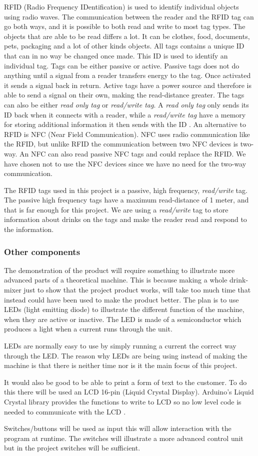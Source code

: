 RFID (Radio Frequency IDentification) is used to identify individual objects using radio waves.
The communication between the reader and the RFID tag can go both ways, and it is possible to both read and write to most tag types. 
The objects that are able to be read differs a lot. It can be clothes, food, documents, pets, packaging and a lot of other kinds objects. 
All tags contains a unique ID that can in no way be changed once made. This ID is used to identify an individual tag.
Tags can be either passive or active. Passive tags does not do anything until a signal from a reader transfers energy to the tag. Once activated it sends a signal back in return. Active tags have a power source and therefore is able to send a signal on their own, making the read-distance greater.
The tags can also be either \textit{read only tag} or \textit{read/write tag}. A \textit{read only tag} only sends its ID back when it connects with a reader, while a \textit{read/write tag} have a memory for storing additional information it then sends with the ID \citep{RFID}.
An alternative to RFID is NFC (Near Field Communication). NFC uses radio communication like the RFID, but unlike RFID the communication between two NFC devices is two-way. An NFC can also read passive NFC tags and could replace the RFID. We have chosen not to use the NFC devices since we have no need for the two-way communication.

The RFID tags used in this project is a passive, high frequency, \textit{read/write} tag. The passive high frequency tags have a maximum read-distance of 1 meter, and that is far enough for this project. We are using a \textit{read/write} tag to store information about drinks on the tags and make the reader read and respond to the information.
\subsubsection{Other components}
The demonstration of the product will require something to illustrate more advanced parts of a theoretical machine.
This is because making a whole drink-mixer just to show that the project product works, will take too much time that instead could have been used to make the product better. 
The plan is to use LEDs (light emitting diode) to illustrate the different function of the machine, when they are active or inactive. The LED is made of a semiconductor which produces a light when a current runs through the unit.

LEDs are normally easy to use by simply running a current the correct way through the LED.
The reason why LEDs are being using instead of making the machine is that there is neither time nor is it the main focus of this project.

It would also be good to be able to print a form of text to the customer. To do this there will be used an LCD 16-pin (Liquid Crystal Display). Arduino's Liquid Crystal library provides the functions to write to LCD so no low level code is needed to communicate with the LCD \citep{ArduinoLCD}.

Switches/buttons will be used as input this will allow interaction with the program at runtime. The switches will illustrate a more advanced control unit but in the project switches will be sufficient.